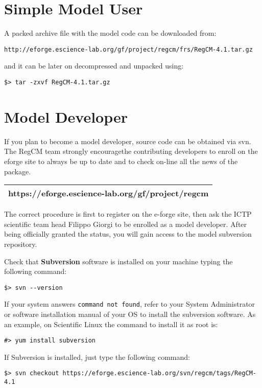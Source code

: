 %
%

\section{Simple Model User}

A packed archive file with the model code can be downloaded from:

\begin{Verbatim}
http://eforge.escience-lab.org/gf/project/regcm/frs/RegCM-4.1.tar.gz
\end{Verbatim}

and it can be later on decompressed and unpacked using:

\begin{Verbatim}
$> tar -zxvf RegCM-4.1.tar.gz
\end{Verbatim}

\section{Model Developer}

If you plan to become a model developer, source code can be obtained via svn.
The RegCM team strongly encouragethe contributing developers to enroll on
the eforge site to always be up to date and to check on-line all the news of
the package.

\vspace{0.5cm}
\begin{tabular}{|c|}
\hline
{\bf https://eforge.escience-lab.org/gf/project/regcm} \\
\hline
\end{tabular}
\vspace{0.5cm}

The correct procedure is first to register on the e-forge site, then ask
the ICTP scientific team head Filippo Giorgi to be enrolled as a model
developer. After being officially granted the status, you will gain
access to the model subversion repository.

Check that {\bf Subversion} software is installed on your machine typing
the following command:

\begin{verbatim}
$> svn --version
\end{verbatim}

If your system answers \verb=command not found=, refer to your System
Administrator or software installation manual of your OS to install the
subversion software. As an example, on Scientific Linux the command
to install it as root is:

\begin{verbatim}
#> yum install subversion
\end{verbatim}

If Subversion is installed, just type the following command:

\begin{verbatim}
$> svn checkout https://eforge.escience-lab.org/svn/regcm/tags/RegCM-4.1
\end{verbatim}

